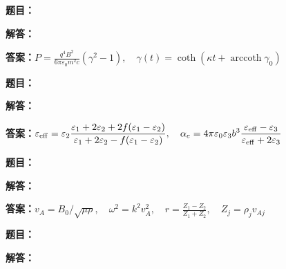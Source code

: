 \documentclass[lang=cn,color=blue,11pt]{elegantbook}
\begin{document}
\par\smallskip\noindent\hrulefill\par\medskip
{}\par
\noindent\textbf{题目：}
\par\noindent\textbf{解答：}
\par\noindent\textbf{答案：}\(\displaystyle P=\frac{q^4B^2}{6\pi\varepsilon_0m^2c}(\gamma^2-1),\quad\gamma(t)=\coth(\kappa t+\operatorname{arccoth}\gamma_0)\)\par
\par\smallskip\noindent\hrulefill\par\medskip
{}\par
\noindent\textbf{题目：}
\par\noindent\textbf{解答：}
\par\noindent\textbf{答案：}\(\displaystyle \varepsilon_{\rm eff}=\varepsilon_2\frac{\varepsilon_1+2\varepsilon_2+2f(\varepsilon_1-\varepsilon_2)}{\varepsilon_1+2\varepsilon_2-f(\varepsilon_1-\varepsilon_2)},\quad\alpha_e=4\pi\varepsilon_0\varepsilon_3b^3\frac{\varepsilon_{\rm eff}-\varepsilon_3}{\varepsilon_{\rm eff}+2\varepsilon_3}\)\par
\par\smallskip\noindent\hrulefill\par\medskip
{}\par
\noindent\textbf{题目：}
\par\noindent\textbf{解答：}
\par\noindent\textbf{答案：}\(\displaystyle v_A=B_0/\sqrt{\mu\rho},\quad\omega^2=k^2v_A^2,\quad r=\frac{Z_1-Z_2}{Z_1+Z_2},\quad Z_j=\rho_jv_{Aj}\)\par
\par\smallskip\noindent\hrulefill\par\medskip
{}\par
\noindent\textbf{题目：}
\par\noindent\textbf{解答：}
\end{document}
